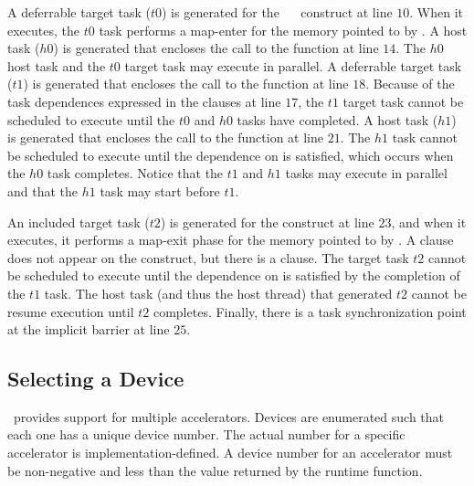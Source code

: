 A deferrable target task ($t0$) is generated for the
~~ construct at line $10$.
When it executes, the $t0$ task performs a map-enter for the memory pointed to by .  
A host task ($h0$) is generated that encloses the call to the function  at line $14$.
The $h0$ host task and the $t0$ target task may execute in parallel.
A deferrable target task ($t1$) is generated that encloses the call to the function  at line $18$.
Because of the task dependences expressed in the  clauses at line
$17$, the $t1$ target task cannot be scheduled to execute until the $t0$ and
$h0$ tasks have completed.
A host task ($h1$) is generated that encloses the call to the function  at line $21$.
The $h1$ task cannot be scheduled to
execute until the dependence on  is satisfied, which occurs when the
$h0$ task completes.  
Notice that the $t1$ and $h1$ tasks may execute in
parallel and that the $h1$ task may start before $t1$.  

An included target task ($t2$) is generated for the 
construct at line $23$, and when it executes, it performs a map-exit phase for
the memory pointed to by .  
A  clause does not appear on the construct, but there is a
 clause.  The target task $t2$ cannot be scheduled to execute until the dependence
on  is satisfied by the completion of the $t1$ task.  
The host task (and thus the host thread)
that generated $t2$ cannot be resume execution until $t2$ completes.
Finally, there is a task
synchronization point at the implicit barrier at line $25$.

\subsection{Selecting a Device}
\label{sec:06.which-device}

\OMP\ provides support for multiple accelerators.  Devices are
enumerated such that each one has a unique device number.  The actual number
for a specific accelerator is implementation-defined.  A device number
for an accelerator must be non-negative and less than the value
returned by the  runtime function.

